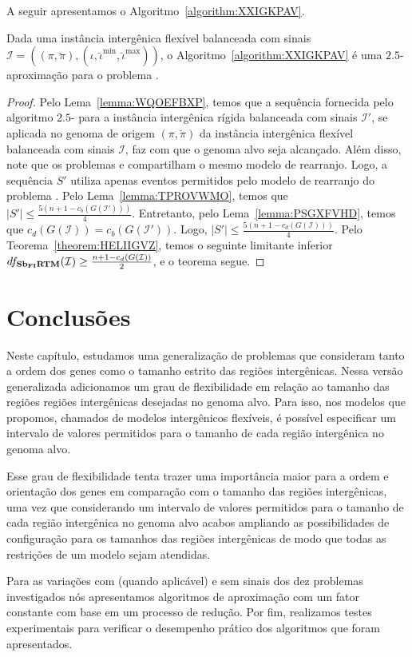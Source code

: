 A seguir apresentamos o Algoritmo~\ref{algorithm:XXIGKPAV}.



\begin{theorem}\label{theorem:BZSXXPYW}
Dada uma instância intergênica flexível balanceada com sinais $\mathcal{I} = ((\pi,\breve\pi),(\iota,\breve\iota^{\min},\breve\iota^{\max}))$, o Algoritmo~\ref{algorithm:XXIGKPAV} é uma $2.5$-aproximação para o problema \SbFIRTM{}.
\end{theorem}
\begin{proof}
Pelo Lema~\ref{lemma:WQOEFBXP}, temos que a sequência fornecida pelo algoritmo $2.5$-\SbIRT{} para a instância intergênica rígida balanceada com sinais $\mathcal{I'}$, se aplicada no genoma de origem $(\pi,\breve\pi)$ da instância intergênica flexível balanceada com sinais $\mathcal{I}$, faz com que o genoma alvo seja alcançado. Além disso, note que os problemas \SbIRTM{} e \SbFIRTM{} compartilham o mesmo modelo de rearranjo. Logo, a sequência $S'$ utiliza apenas eventos permitidos pelo modelo de rearranjo do problema \SbFIRTM{}. Pelo Lema~\ref{lemma:TPROVWMO}, temos que $|S'| \le \frac{5({n+1} - c_b(G(\mathcal{I}')))}{4}$. Entretanto, pelo Lema~\ref{lemma:PSGXFVHD}, temos que $c_d(G(\mathcal{I})) = c_b(G(\mathcal{I}'))$. Logo, $|S'| \le \frac{5({n+1} - c_d(G(\mathcal{I})))}{4}$. Pelo Teorema~\ref{theorem:HELIIGVZ}, temos o seguinte limitante inferior $df_{\textbf{Sb\textsubscript{FI}RTM}}(\mathcal{I}) \ge \frac{{n+1} - c_d(G(\mathcal{I}))}{2}$, e o teorema segue.
\end{proof}

\section{Conclusões}

Neste capítulo, estudamos uma generalização de problemas que consideram tanto a ordem dos genes como o tamanho estrito das regiões intergênicas. Nessa versão generalizada adicionamos um grau de flexibilidade em relação ao tamanho das regiões regiões intergênicas desejadas no genoma alvo. Para isso, nos modelos que propomos, chamados de modelos intergênicos flexíveis, é possível especificar um intervalo de valores permitidos para o tamanho de cada região intergênica no genoma alvo. 

Esse grau de flexibilidade tenta trazer uma importância maior para a ordem e orientação dos genes em comparação com o tamanho das regiões intergênicas, uma vez que considerando um intervalo de valores permitidos para o tamanho de cada região intergênica no genoma alvo acabos ampliando as possibilidades de configuração para os tamanhos das regiões intergênicas de modo que todas as restrições de um modelo sejam atendidas.

Para as variações com (quando aplicável) e sem sinais dos dez problemas investigados nós apresentamos algoritmos de aproximação com um fator constante com base em um processo de redução. Por fim, realizamos testes experimentais para verificar o desempenho prático dos algoritmos que foram apresentados.